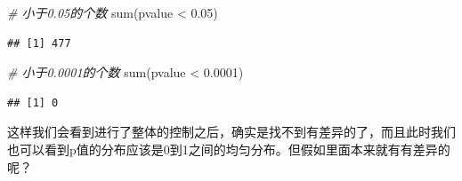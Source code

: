 \documentclass[]{tufte-book}
\newenvironment{Shaded}{}{}
\newcommand{\AttributeTok}[1]{\textcolor[rgb]{0.49,0.56,0.16}{#1}}
\newcommand{\CommentTok}[1]{\textcolor[rgb]{0.38,0.63,0.69}{\textit{#1}}}
\newcommand{\ConstantTok}[1]{\textcolor[rgb]{0.53,0.00,0.00}{#1}}
\newcommand{\ControlFlowTok}[1]{\textcolor[rgb]{0.00,0.44,0.13}{\textbf{#1}}}
\newcommand{\DecValTok}[1]{\textcolor[rgb]{0.25,0.63,0.44}{#1}}
\newcommand{\FloatTok}[1]{\textcolor[rgb]{0.25,0.63,0.44}{#1}}
\newcommand{\FunctionTok}[1]{\textcolor[rgb]{0.02,0.16,0.49}{#1}}
\newcommand{\NormalTok}[1]{#1}
\newcommand{\OtherTok}[1]{\textcolor[rgb]{0.00,0.44,0.13}{#1}}
\newcommand{\SpecialCharTok}[1]{\textcolor[rgb]{0.25,0.44,0.63}{#1}}
\newcommand{\StringTok}[1]{\textcolor[rgb]{0.25,0.44,0.63}{#1}}
\begin{document}
\begin{Shaded}
\begin{Highlighting}[]
\CommentTok{\# 小于0.05的个数}
\FunctionTok{sum}\NormalTok{(pvalue }\SpecialCharTok{\textless{}} \FloatTok{0.05}\NormalTok{)}
\end{Highlighting}
\end{Shaded}

\begin{verbatim}
## [1] 477
\end{verbatim}

\begin{Shaded}
\begin{Highlighting}[]
\CommentTok{\# 小于0.0001的个数}
\FunctionTok{sum}\NormalTok{(pvalue }\SpecialCharTok{\textless{}} \FloatTok{0.0001}\NormalTok{)}
\end{Highlighting}
\end{Shaded}

\begin{verbatim}
## [1] 0
\end{verbatim}

这样我们会看到进行了整体的控制之后，确实是找不到有差异的了，而且此时我们也可以看到p值的分布应该是0到1之间的均匀分布。但假如里面本来就有有差异的呢？

\begin{Shaded}
\end{Shaded}
\end{document}
